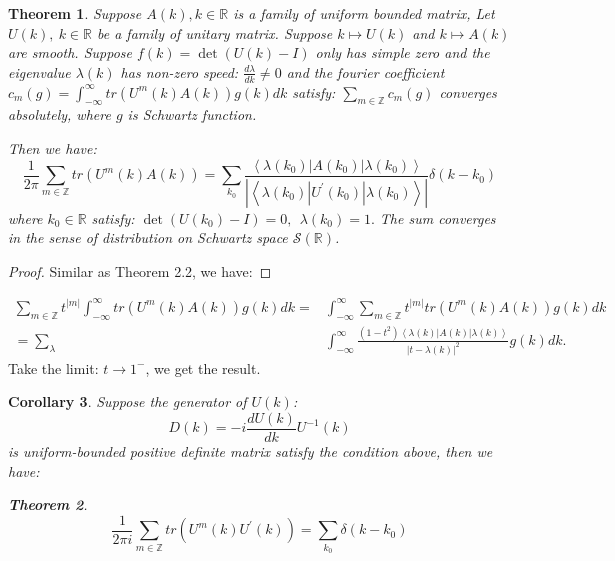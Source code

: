 \documentclass[draft]{article}
\newtheorem{thm}{Theorem}[section]
\newtheorem{cor}[thm]{Corollary}
\theoremstyle{definition}
\theoremstyle{remark}
\newcommand{\R}{\mathbb{R}}
\newcommand{\Z}{\mathbb{Z}}
\begin{document}
\begin{thm}
	Suppose $A\left(k\right), k\in \R$ is a family of uniform bounded matrix,	Let $U\left(k\right),\ k\in\R$ be a family of unitary matrix. Suppose $k \mapsto U\left(k\right)$ and $k \mapsto A\left(k\right)$ are smooth. Suppose $f\left(k\right)=\det\left(U\left(k\right)-I\right)$ only has simple zero and the eigenvalue $\lambda\left(k\right)$ has non-zero speed: $\frac{d\lambda}{dk}\neq 0$ and the fourier coefficient $c_m\left(g\right) =\int_{-\infty}^{\infty}tr\left( U^m\left(k\right)A\left(k\right) \right)g\left(k\right)dk$ satisfy: $\sum_{m\in \Z}c_m\left(g\right)$ converges absolutely, where $g$ is Schwartz function.
		
	Then we have:
	$$\frac{1}{2\pi}\sum_{m\in \Z}tr\left(U^m\left(k\right)A\left(k \right)  \right)= \sum_{k_0} \frac{\left \langle \lambda\left (k_0\right )  |A\left (k_0\right ) |\lambda\left (k_0\right )   \right \rangle }{\left | \left \langle \lambda\left (k_0\right )  |U^{'}\left (k_0\right ) |\lambda\left (k_0\right )   \right \rangle \right | }\delta\left(k-k_0\right) $$
where $k_0\in \R$ satisfy: $\det\left(U\left(k_0\right)-I\right)=0, \ \ \lambda\left(k_0 \right)=1. $
	The sum converges in the sense of distribution on Schwartz space $\mathcal{S}\left(\R\right) $.
\end{thm}
\begin{proof}
	Similar as Theorem 2.2, we have:
\end{proof}
\begin{align*}
	\sum_{m\in \Z}t^{\left|m\right| }\int_{-\infty}^{\infty}tr\left(U^m\left(k\right)A\left(k \right) \right)g\left (k\right )dk=& 	\int_{-\infty}^{\infty}\sum_{m\in \Z}t^{\left|m\right| }tr\left(U^m\left(k\right)A\left(k \right) \right)g\left (k\right )dk \\
	=\sum_{\lambda}&\int_{-\infty}^{\infty}\frac{(1-t^2)\left \langle \lambda\left (k\right )  |A\left (k\right ) |\lambda\left (k\right )   \right \rangle}{\left | t-\lambda\left (k\right )  \right |^2 } g\left (k\right )dk.
\end{align*}
Take the limit: $t\to 1^{-}$, we get the result.
\begin{cor}
	Suppose the generator of $U\left(k\right)$: 
	$$D\left(k\right)=-i\frac{dU(k)}{dk}U^{-1}\left(k\right)$$
	is uniform-bounded positive definite matrix satisfy the condition above, then we have:
\begin{thm}
	$$\frac{1}{2\pi i}\sum_{m\in \Z}tr\left(U^m\left(k\right)U^{'}\left(k \right)  \right)= \sum_{k_0} \delta\left(k-k_0\right) $$
\end{thm}
\end{cor}
\end{document}
